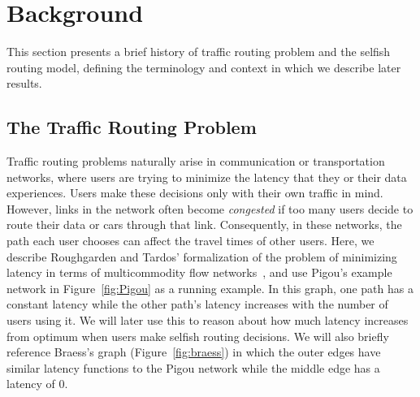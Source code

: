\section{Background}
\label{sec:background}
This section presents a brief history of traffic routing problem and the selfish routing model, defining the terminology and context in which 
we describe later results.

\subsection{The Traffic Routing Problem}
Traffic routing problems naturally arise in communication or transportation networks, where users are trying to minimize the latency that they or their data experiences. Users make these decisions only with their own traffic in mind.
However, links in the network often become \emph{congested} if too many users decide to route their data 
or cars through that link. Consequently, in these networks, the path each user chooses can affect the travel times of other
users. Here, we describe Roughgarden and Tardos' formalization of the problem of minimizing latency in terms of multicommodity flow networks~\cite{tardos,roughgarden}, and use Pigou's example network in Figure~\ref{fig:Pigou} as a running example. In this graph, one path has a constant latency while the other path's latency increases with the number of users using it. We will later use this to reason about how much latency increases from optimum when users make selfish routing decisions. We will also briefly reference Braess's graph (Figure~\ref{fig:braess}) in which the outer edges have similar latency functions to the Pigou network while the middle edge has a latency of $0$.


